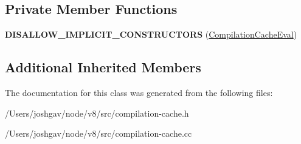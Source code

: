 \subsection*{Private Member Functions}
\begin{DoxyCompactItemize}
\item 
{\bfseries D\+I\+S\+A\+L\+L\+O\+W\+\_\+\+I\+M\+P\+L\+I\+C\+I\+T\+\_\+\+C\+O\+N\+S\+T\+R\+U\+C\+T\+O\+RS} (\hyperlink{classv8_1_1internal_1_1_compilation_cache_eval}{Compilation\+Cache\+Eval})\hypertarget{classv8_1_1internal_1_1_compilation_cache_eval_a6fc0adc12f4284add215a4561611866b}{}\label{classv8_1_1internal_1_1_compilation_cache_eval_a6fc0adc12f4284add215a4561611866b}

\end{DoxyCompactItemize}
\subsection*{Additional Inherited Members}


The documentation for this class was generated from the following files\+:\begin{DoxyCompactItemize}
\item 
/\+Users/joshgav/node/v8/src/compilation-\/cache.\+h\item 
/\+Users/joshgav/node/v8/src/compilation-\/cache.\+cc\end{DoxyCompactItemize}
